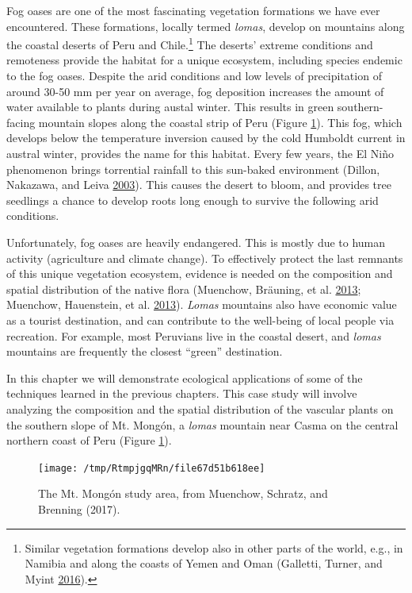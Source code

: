 \documentclass[]{krantz}
\let\rmarkdownfootnote\footnote%
\def\footnote{\protect\rmarkdownfootnote}
\begin{document}
Fog oases are one of the most fascinating vegetation formations we have ever encountered.
These formations, locally termed \emph{lomas}, develop on mountains along the coastal deserts of Peru and Chile.\footnote{Similar vegetation formations develop also in other parts of the world, e.g., in Namibia and along the coasts of Yemen and Oman (Galletti, Turner, and Myint \protect\hyperlink{ref-galletti_land_2016}{2016}).}
The deserts' extreme conditions and remoteness provide the habitat for a unique ecosystem, including species endemic to the fog oases.
Despite the arid conditions and low levels of precipitation of around 30-50 mm per year on average, fog deposition increases the amount of water available to plants during austal winter.
This results in green southern-facing mountain slopes along the coastal strip of Peru (Figure \ref{fig:study-area-mongon}).
This fog, which develops below the temperature inversion caused by the cold Humboldt current in austral winter, provides the name for this habitat.
Every few years, the El Niño phenomenon brings torrential rainfall to this sun-baked environment (Dillon, Nakazawa, and Leiva \protect\hyperlink{ref-dillon_lomas_2003}{2003}).
This causes the desert to bloom, and provides tree seedlings a chance to develop roots long enough to survive the following arid conditions.

Unfortunately, fog oases are heavily endangered.
This is mostly due to human activity (agriculture and climate change).
To effectively protect the last remnants of this unique vegetation ecosystem, evidence is needed on the composition and spatial distribution of the native flora (Muenchow, Bräuning, et al. \protect\hyperlink{ref-muenchow_predictive_2013}{2013}; Muenchow, Hauenstein, et al. \protect\hyperlink{ref-muenchow_soil_2013}{2013}).
\emph{Lomas} mountains also have economic value as a tourist destination, and can contribute to the well-being of local people via recreation.
For example, most Peruvians live in the coastal desert, and \emph{lomas} mountains are frequently the closest ``green'' destination.

In this chapter we will demonstrate ecological applications of some of the techniques learned in the previous chapters.
This case study will involve analyzing the composition and the spatial distribution of the vascular plants on the southern slope of Mt. Mongón, a \emph{lomas} mountain near Casma on the central northern coast of Peru (Figure \ref{fig:study-area-mongon}).

\begin{figure}[t]

{\centering \texttt{[image: /tmp/RtmpjgqMRn/file67d51b618ee]} 

}

\caption[The Mt. Mongón study area.]{The Mt. Mongón study area, from Muenchow, Schratz, and Brenning (2017).}\label{fig:study-area-mongon}
\end{figure}
\end{document}

